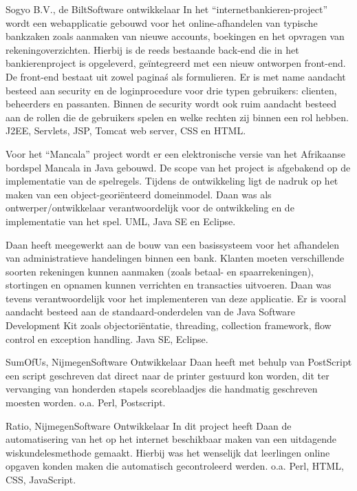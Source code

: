 \begin{workExperience}{Sogyo B.V., de Bilt}{Software ontwikkelaar}{}
		In het ``internetbankieren-project'' wordt een webapplicatie gebouwd voor
		het online-afhandelen van typische bankzaken zoals aanmaken van nieuwe 
		accounts, boekingen en het opvragen van rekeningoverzichten. Hierbij is
		de reeds bestaande back-end die in het bankierenproject is opgeleverd, 
		ge\"integreerd met een nieuw ontworpen front-end. De front-end bestaat uit
		zowel pagina\'s als formulieren. Er is met name aandacht besteed aan
		security en de loginprocedure voor drie typen gebruikers: clienten, 
		beheerders en passanten. Binnen de security wordt ook ruim aandacht 
		besteed aan de rollen die de gebruikers spelen en welke rechten zij
		binnen een rol hebben.
		\technics J2EE, Servlets, JSP, Tomcat web server, CSS en HTML. 
		
		Voor het ``Mancala'' project wordt er een elektronische versie van het 
		Afrikaanse bordspel Mancala in Java gebouwd. De scope van het 
		project is afgebakend op de implementatie van de spelregels. Tijdens
		de ontwikkeling ligt de nadruk op het maken van een 
		object-geori\"enteerd domeinmodel. Daan was als ontwerper/ontwikkelaar
		verantwoordelijk voor de ontwikkeling en de implementatie van het 
		spel.
		\technics UML, Java SE en Eclipse.
		
		Daan heeft meegewerkt aan de bouw van een basissysteem voor het 
		afhandelen van administratieve handelingen binnen een bank. Klanten 
		moeten verschillende soorten rekeningen kunnen aanmaken (zoals betaal- 
		en spaarrekeningen), stortingen en opnamen kunnen verrichten en 
		transacties uitvoeren. Daan was tevens verantwoordelijk voor het 
		implementeren van deze applicatie. 
		Er is vooral aandacht besteed aan de standaard-onderdelen van de Java 
		Software Development Kit zoals objectori\"entatie, threading, collection 
		framework, flow control en exception handling.
		\technics Java SE, Eclipse. 
	\end{workExperience}
	
	\begin{workExperience}{SumOfUs, Nijmegen}{Software Ontwikkelaar}{}
		Daan heeft met behulp van PostScript een script geschreven dat direct 
		naar de printer gestuurd kon worden, dit ter vervanging van honderden 
		stapels scoreblaadjes die handmatig geschreven moesten worden.
		\technics o.a. Perl, Postscript.
	\end{workExperience}

	\begin{workExperience}{Ratio, Nijmegen}{Software Ontwikkelaar}{}
		In dit project heeft Daan de automatisering van het op het internet 
		beschikbaar maken van een uitdagende wiskundelesmethode gemaakt. Hierbij
		was het wenselijk dat leerlingen online opgaven konden maken die 
		automatisch gecontroleerd werden.
		\technics o.a. Perl, HTML, CSS, JavaScript.	
	\end{workExperience}

